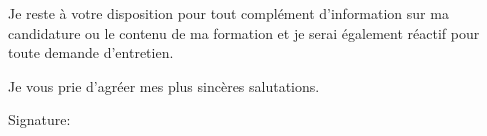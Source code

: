 \documentclass[11pt]{article}
\begin{document}
\vspace{0.5cm}
Je reste à votre disposition pour tout complément d'information sur ma candidature ou le contenu de ma formation et je serai également réactif pour toute demande d'entretien.


\vspace{0.5cm}
Je vous prie d'agréer mes plus sincères salutations.

\vspace{1cm}

\hfill
Signature: \hspace{5cm}
\end{document}
